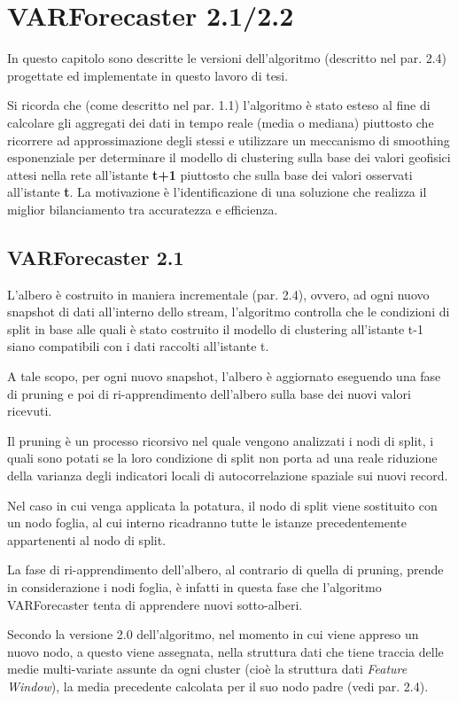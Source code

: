 \documentclass[12pt,a4paper,oneside,openright]{book}
\begin{document}
\chapter{VARForecaster 2.1/2.2}
In questo capitolo sono descritte le versioni dell'algoritmo (descritto nel par. 2.4) progettate ed implementate in questo lavoro di tesi. 

Si ricorda che (come descritto nel par. 1.1) l'algoritmo è stato esteso al fine di calcolare gli aggregati dei dati in tempo reale (media o mediana) piuttosto che ricorrere ad approssimazione degli stessi e utilizzare un meccanismo di smoothing esponenziale per determinare il modello di clustering sulla base dei valori geofisici attesi nella rete all'istante {\bfseries t+1} piuttosto che sulla base dei valori osservati all'istante {\bfseries t}. La motivazione è l'identificazione di una soluzione che realizza il miglior bilanciamento tra accuratezza e efficienza.
\section{VARForecaster 2.1}
L'albero è costruito in maniera incrementale (par. 2.4), ovvero, ad ogni nuovo snapshot di dati all'interno dello stream, l'algoritmo controlla che le condizioni di split in base alle quali è stato costruito il modello di clustering all'istante t-1 siano compatibili con i dati raccolti all'istante t.

A tale scopo, per ogni nuovo snapshot, l'albero è aggiornato eseguendo una fase di pruning e poi di ri-apprendimento dell'albero sulla base dei nuovi valori ricevuti. 

Il pruning è un processo ricorsivo nel quale vengono analizzati i nodi di split, i quali sono potati se la loro condizione di split non porta ad una reale riduzione della varianza degli indicatori locali di autocorrelazione spaziale sui nuovi record. 

Nel caso in cui venga applicata la potatura, il nodo di split viene sostituito con un nodo foglia, al cui interno ricadranno tutte le istanze precedentemente appartenenti al nodo di split. 

La fase di ri-apprendimento dell'albero, al contrario di quella di pruning, prende in considerazione i nodi foglia, è infatti in questa fase che l'algoritmo VARForecaster tenta di apprendere nuovi sotto-alberi.

Secondo la versione 2.0 dell'algoritmo, nel momento in cui viene appreso un nuovo nodo, a questo viene assegnata, nella struttura dati che tiene traccia delle medie multi-variate assunte da ogni cluster (cioè la struttura dati \textit{Feature Window}), la media precedente calcolata per il suo nodo padre (vedi par. 2.4). 
\end{document}
